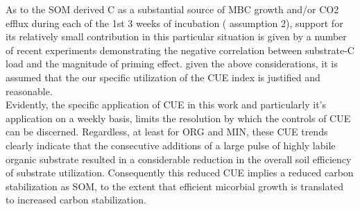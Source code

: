 \documentclass[12pt]{report}
\begin{document}
As to the SOM derived C as a substantial source of MBC growth and/or CO2 efflux during each of the 1st 3 weeks of incubation ( assumption 2),  support for its relatively small contribution in this particular situation is given by a number of recent experiments demonstrating the negative correlation between substrate-C load and the magnitude of priming effect\citep{blagodatskaya2011, schneckenberger2008, wu1993}.
given the above considerations, it is assumed that the our specific utilization of the CUE index is justified and reasonable.\\
Evidently, the specific application of CUE in this work and particularly it's application on a weekly basis, limits the resolution by which the controls of CUE can be discerned. Regardless, at least for ORG and MIN, these CUE trends clearly indicate that the consecutive additions of a large pulse of highly labile organic substrate resulted in a considerable reduction in the overall soil efficiency of substrate utilization. Consequently this reduced CUE implies a reduced carbon stabilization as SOM, to the extent that efficient micorbial growth is translated to increased carbon stabilization.
\end{document}
